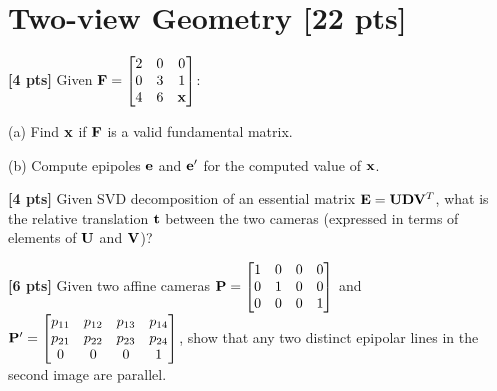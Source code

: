 \section{Two-view Geometry  [22 pts]}
\begin{questions}

    \question \textbf{[4 pts]} Given $\mathbf{F} = \begin{bmatrix}
            2 & 0 & 0   \\
            0 & 3 & 1   \\
            4 & 6 & \mathbf{x}
        \end{bmatrix}$:

    (a) Find $\mathbf{x}$ if $\mathbf{F}$ is a valid fundamental matrix.

    \begin{tcolorbox}[fit,height=8cm, width=\textwidth, blank, borderline={0.5pt}{-2pt},halign=left, valign=center, nobeforeafter]
    \end{tcolorbox}

    (b) Compute epipoles $\mathbf{e}$ and $\mathbf{e}'$ for the computed value of $\mathbf{x}$.

    \begin{tcolorbox}[fit,height fill, width=\textwidth, blank, borderline={0.5pt}{-2pt},halign=left, valign=center, nobeforeafter]
    \end{tcolorbox}

    \question \textbf{[4 pts]} Given SVD decomposition of an essential matrix $\mathbf{E} = \mathbf{U}\mathbf{D}\mathbf{V}^T$, what is the relative translation $\mathbf{t}$ between the two cameras (expressed in terms of elements of $\mathbf{U}$  and $\mathbf{V}$)?

    \begin{tcolorbox}[fit,height fill, width=\textwidth, blank, borderline={0.5pt}{-2pt},halign=left, valign=center, nobeforeafter]
    \end{tcolorbox}

    \question \textbf{[6 pts]} Given two affine cameras $\mathbf{P} = \begin{bmatrix}
            1 & 0 & 0 & 0 \\
            0 & 1 & 0 & 0 \\
            0 & 0 & 0 & 1
        \end{bmatrix}$ and $\mathbf{P}' = \begin{bmatrix}
            p_{11} & p_{12} & p_{13} & p_{14} \\
            p_{21} & p_{22} & p_{23} & p_{24} \\
            0      & 0      & 0      & 1
        \end{bmatrix}$, show that any two distinct epipolar lines in the second image are parallel.


\end{questions}
